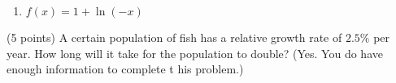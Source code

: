 \documentclass[12pt]{article}
\begin{document}
\begin{enumerate}
\begin{enumerate}
\begin{minipage}[c]{10cm}
\end{minipage}
\vfill
\item 
\begin{minipage}[t]{7cm}
$f(x)=1+\ln(-x)$\\
\end{minipage}%
\begin{minipage}[c]{10cm}
\end{minipage}
\end{enumerate}
\vfill
\end{enumerate}
{} (5 points) A certain population of fish has a relative growth rate of $2.5\%$ per year. How long will it take for the population to double? (Yes. You do have enough information to complete t his problem.)
\vspace{.6in}
\end{document}

